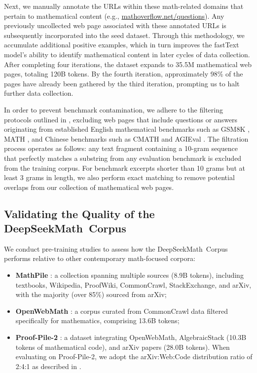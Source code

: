 Next, we manually annotate the URLs within these math-related domains that pertain to mathematical content (e.g., \url{mathoverflow.net/questions}). Any previously uncollected web page associated with these annotated URLs is subsequently incorporated into the seed dataset. Through this methodology, we accumulate additional positive examples, which in turn improves the fastText model’s ability to identify mathematical content in later cycles of data collection. After completing four iterations, the dataset expands to 35.5M mathematical web pages, totaling 120B tokens. By the fourth iteration, approximately 98\% of the pages have already been gathered by the third iteration, prompting us to halt further data collection.

In order to prevent benchmark contamination, we adhere to the filtering protocols outlined in \cite{deepseek-coder}, excluding web pages that include questions or answers originating from established English mathematical benchmarks such as GSM8K \citep{gsm8k}, MATH \citep{MATH}, and Chinese benchmarks such as CMATH \citep{wei2023cmath} and AGIEval \citep{agieval}. The filtration process operates as follows: any text fragment containing a 10-gram sequence that perfectly matches a substring from any evaluation benchmark is excluded from the training corpus. For benchmark excerpts shorter than 10 grams but at least 3 grams in length, we also perform exact matching to remove potential overlaps from our collection of mathematical web pages.

\subsection{Validating the Quality of the DeepSeekMath~Corpus}

We conduct pre-training studies to assess how the DeepSeekMath~Corpus performs relative to other contemporary math-focused corpora:

\begin{itemize}[topsep=0pt]
    \item \textbf{MathPile} \citep{mathpile}: a collection spanning multiple sources (8.9B tokens), including textbooks, Wikipedia, ProofWiki, CommonCrawl, StackExchange, and arXiv, with the majority (over 85\%) sourced from arXiv;
    \item \textbf{OpenWebMath} \citep{openwebmath}: a corpus curated from CommonCrawl data filtered specifically for mathematics, comprising 13.6B tokens;
    \item \textbf{Proof-Pile-2} \citep{llemma}: a dataset integrating OpenWebMath, AlgebraicStack (10.3B tokens of mathematical code), and arXiv papers (28.0B tokens). When evaluating on Proof-Pile-2, we adopt the arXiv:Web:Code distribution ratio of 2:4:1 as described in \cite{llemma}.
\end{itemize}


